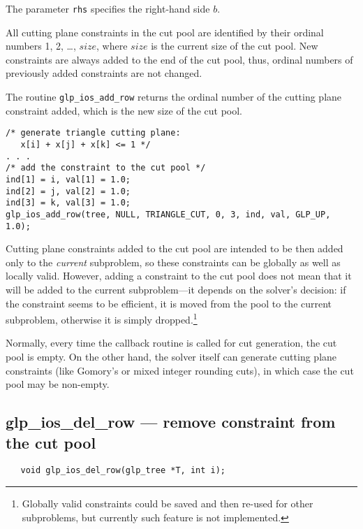 The parameter \verb|rhs| specifies the right-hand side $b$.

All cutting plane constraints in the cut pool are identified by their
ordinal numbers 1, 2, \dots, $size$, where $size$ is the current size
of the cut pool. New constraints are always added to the end of the cut
pool, thus, ordinal numbers of previously added constraints are not
changed.

\returns

The routine \verb|glp_ios_add_row| returns the ordinal number of the
cutting plane constraint added, which is the new size of the cut pool.


\begin{verbatim}
/* generate triangle cutting plane:
   x[i] + x[j] + x[k] <= 1 */
. . .
/* add the constraint to the cut pool */
ind[1] = i, val[1] = 1.0;
ind[2] = j, val[2] = 1.0;
ind[3] = k, val[3] = 1.0;
glp_ios_add_row(tree, NULL, TRIANGLE_CUT, 0, 3, ind, val, GLP_UP, 1.0);
\end{verbatim}


Cutting plane constraints added to the cut pool are intended to be then
added only to the {\it current} subproblem, so these constraints can be
globally as well as locally valid. However, adding a constraint to the
cut pool does not mean that it will be added to the current
subproblem---it depends on the solver's decision: if the constraint
seems to be efficient, it is moved from the pool to the current
subproblem, otherwise it is simply dropped.\footnote{Globally valid
constraints could be saved and then re-used for other subproblems, but
currently such feature is not implemented.}

Normally, every time the callback routine is called for cut generation,
the cut pool is empty. On the other hand, the solver itself can
generate cutting plane constraints (like Gomory's or mixed integer
rounding cuts), in which case the cut pool may be non-empty.

\subsection{glp\_ios\_del\_row --- remove constraint from the cut pool}

\synopsis

\begin{verbatim}
   void glp_ios_del_row(glp_tree *T, int i);
\end{verbatim}

